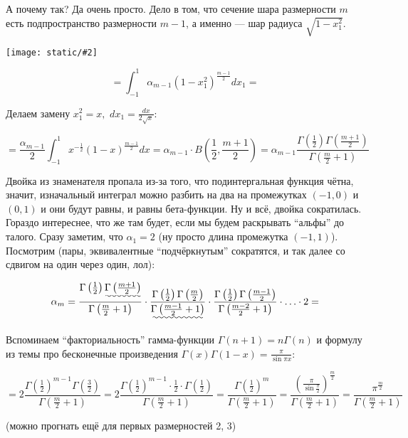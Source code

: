 \documentclass{article}
\def\dbl{\,\,}
\def\images#1#2{\begin{center}\texttt{[image: static/\#2]}\end{center}}
\begin{document}
А почему так? Да очень просто. Дело в том, что сечение шара размерности $m$ есть подпространство размерности $m - 1$, а именно --- шар радиуса $\sqrt{1 - x_1^2}$.

\images{0.5}{objom.jpg}

\[= \int_{-1}^{1} \alpha_{m - 1} (1 - x_1^2)^{\frac{m - 1}{2}} dx_1 = \]

Делаем замену $x_1^2 = x, \dbl dx_1 = \frac{dx}{2\sqrt{x}}$:

\[= \frac{\alpha_{m - 1}}{2} \int_{-1}^{1} x^{-\frac{1}{2}}(1 - x)^{\frac{m - 1}{2}}dx = \alpha_{m - 1} \cdot B\left(\frac{1}{2}, \frac{m + 1}{2}\right) = \alpha_{m - 1}\frac{\Gamma\left(\frac{1}{2}\right)\Gamma\left(\frac{m + 1}{2}\right)}{\Gamma\left(\frac{m}{2} + 1\right)}\]

Двойка из знаменателя пропала из-за того, что подинтергальная функция чётна, значит, изначальный интеграл можно разбить на два на промежутках $(-1, 0)$ и $(0, 1)$ и они будут равны, и равны бета-функции. Ну и всё, двойка сократилась. Гораздо интереснее, что же там будет, если мы будем раскрывать ``альфы'' до талого. Сразу заметим, что $\alpha_1 = 2$ (ну просто длина промежутка $(-1, 1)$). Посмотрим (пары, эквивалентные ``подчёркнутым'' сократятся, и так далее со сдвигом на один через один, лол):

\[\alpha_{m} = \frac{\Gamma\left(\frac{1}{2}\right)\uwave{\Gamma\left(\frac{m + 1}{2}\right)}}{\Gamma\left(\frac{m}{2} + 1\right)} \cdot \frac{\Gamma\left(\frac{1}{2}\right)\Gamma\left(\frac{m}{2}\right)}{\uwave{\Gamma\left(\frac{m - 1}{2} + 1\right)}} \cdot \frac{\Gamma\left(\frac{1}{2}\right)\Gamma\left(\frac{m - 1}{2}\right)}{\Gamma\left(\frac{m - 2}{2} + 1\right)} \cdot \ldots \cdot 2 = \]

Вспоминаем ``факториальность'' гамма-функции $\Gamma(n + 1) = n\Gamma(n)$ и формулу из темы про бесконечные произведения $\Gamma(x)\Gamma(1 - x) = \frac{\pi}{\sin \pi x}$:

\[= 2\frac{\Gamma\left(\frac{1}{2}\right)^{m - 1}\Gamma\left(\frac{3}{2}\right)}{\Gamma\left(\frac{m}{2} + 1\right)} = 2\frac{\Gamma\left(\frac{1}{2}\right)^{m - 1}\cdot \frac{1}{2} \cdot\Gamma\left(\frac{1}{2}\right)}{\Gamma\left(\frac{m}{2} + 1\right)} = \frac{\Gamma\left(\frac{1}{2}\right)^{m}}{\Gamma\left(\frac{m}{2} + 1\right)} = \frac{\left(\frac{\pi}{\sin \frac{\pi}{2}}\right)^{\frac{m}{2}}}{\Gamma\left(\frac{m}{2} + 1\right)} = \frac{\pi^{\frac{m}{2}}}{\Gamma\left(\frac{m}{2} + 1\right)}\]

(можно прогнать ещё для первых размерностей 2, 3)
\end{document}

